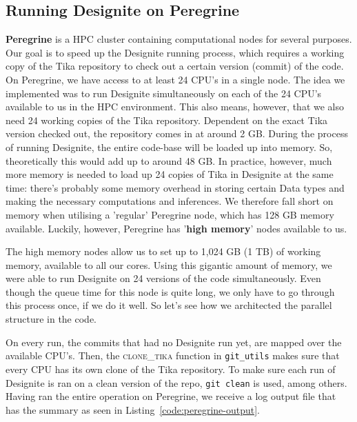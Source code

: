 \documentclass{article}
\begin{document}
\subsection{Running Designite on Peregrine}
\textbf{Peregrine} is a HPC cluster containing computational nodes for several purposes. Our goal is to speed up the Designite running process, which requires a working copy of the Tika repository to check out a certain version (commit) of the code. On Peregrine, we have access to at least 24 CPU's in a single node. The idea we implemented was to run Designite simultaneously on each of the 24 CPU's available to us in the HPC environment. This also means, however, that we also need 24 working copies of the Tika repository. Dependent on the exact Tika version checked out, the repository comes in at around 2 GB. During the process of running Designite, the entire code-base will be loaded up into memory. So, theoretically this would add up to around 48 GB. In practice, however, much more memory is needed to load up 24 copies of Tika in Designite at the same time: there's probably some memory overhead in storing certain Data types and making the necessary computations and inferences. We therefore fall short on memory when utilising a 'regular' Peregrine node, which has 128 GB memory available. Luckily, however, Peregrine has '\textbf{high memory}' nodes available to us.

The high memory nodes allow us to set up to 1,024 GB (1 TB) of working memory, available to all our cores. Using this gigantic amount of memory, we were able to run Designite on 24 versions of the code simultaneously. Even though the queue time for this node is quite long, we only have to go through this process once, if we do it well. So let's see how we architected the parallel structure in the code.

On every run, the commits that had no Designite run yet, are mapped over the available CPU's. Then, the \textsc{clone\_tika} function in \texttt{git\_utils} makes sure that every CPU has its own clone of the Tika repository. To make sure each run of Designite is ran on a clean version of the repo, \texttt{git clean} is used, among others. Having ran the entire operation on Peregrine, we receive a log output file that has the summary as seen in Listing~\ref{code:peregrine-output}.
\end{document}
